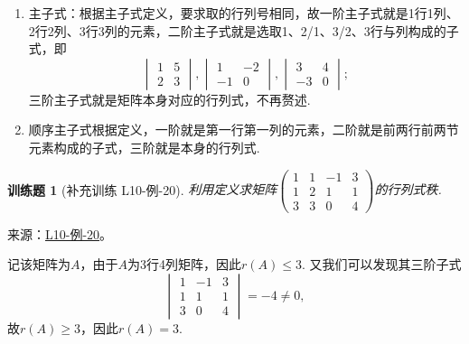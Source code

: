 \documentclass[UTF8,12pt,a4paper,fontset=fandol]{ctexart}
\newtheorem{exercise}{训练题}[section]
\begin{document}
\begin{solve}
\begin{enumerate}
        \item 主子式：根据主子式定义，要求取的行列号相同，故一阶主子式就是1行1列、2行2列、3行3列的元素，二阶主子式就是选取1、2/1、3/2、3行与列构成的子式，即
              \[\begin{vmatrix}
                      1 & 5 \\ 2 & 3
                  \end{vmatrix},\begin{vmatrix}
                      1 & -2 \\ -1 & 0
                  \end{vmatrix},\begin{vmatrix}
                      3 & 4 \\ -3 & 0
                  \end{vmatrix};\]
              三阶主子式就是矩阵本身对应的行列式，不再赘述.

        \item 顺序主子式根据定义，一阶就是第一行第一列的元素，二阶就是前两行前两节元素构成的子式，三阶就是本身的行列式.
    \end{enumerate}
\end{solve}

\begin{exercise}[补充训练 L10-例-20]\label{prob:L10-例-20}
利用定义求矩阵$\begin{pmatrix}
            1 & 1 & -1 & 3 \\ 1 & 2 & 1 & 1 \\ 3 & 3 & 0 & 4
        \end{pmatrix}$的行列式秩.
\end{exercise}
\noindent 来源：\href{https://github.com/yhwu-is/Linear-Algebra-Left-Undone/blob/new/%E8%AE%B2%E4%B9%89/%E4%B8%93%E9%A2%98/10%20%E8%A1%8C%E5%88%97%E5%BC%8F.tex}{L10-例-20}。
\begin{solve}
记该矩阵为$A$，由于$A$为3行4列矩阵，因此$r(A)\leqslant 3$. 又我们可以发现其三阶子式
    \[\begin{vmatrix}
            1 & -1 & 3 \\ 1 & 1 & 1 \\ 3 & 0 & 4
        \end{vmatrix}=-4\neq 0,\]
    故$r(A)\geqslant 3$，因此$r(A)=3$.
\end{solve}
\end{document}
